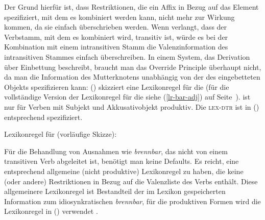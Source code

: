Der Grund hierfür ist, dass Restriktionen, die ein Affix in Bezug auf das Element spezifiziert, mit dem es
kombiniert werden kann, nicht mehr zur Wirkung kommen, da sie einfach überschrieben werden.
Wenn \zb \bars verlangt, dass der Verbstamm, mit dem es kombiniert wird, transitiv ist, würde es bei
der Kombination mit einem intransitiven Stamm die Valenzinformation des intransitiven Stammes
einfach überschreiben.
In einem System, das Derivation über Einbettung beschreibt, braucht man das Override Principle
überhaupt nicht, da man die Information des Mutterknotens unabhängig von der des eingebetteten
Objekts spezifizieren kann: () skizziert eine Lexikonregel für die \bard (für die
vollständige Version der Lexikonregel für die \bard siehe (\ref{lr-bar-adj}) auf Seite~\pageref{lr-bar-adj}).
\bard ist nur für Verben mit Subjekt und Akkusativobjekt produktiv. Die \textsc{lex-dtr} ist in
() entsprechend spezifiziert. 

\eas
\label{lr-bard-skizze}%
Lexikonregel für \bard (vorläufige Skizze):\\
\zs

Für die Behandlung von Ausnahmen wie \zb \emph{brennbar}, das nicht von einem transitiven Verb
abgeleitet ist, benötigt man keine Defaults. Es reicht, eine entsprechend allgemeine (nicht
produktive) Lexikonregel zu haben, die keine (oder andere) Restriktionen in Bezug auf die Valenzliste des Verbs enthält. 
Diese allgemeinere Lexikonregel ist Bestandteil der im Lexikon gespeicherten Information
zum idiosynkratischen \emph{brennbar}, für die produktiven Formen wird die Lexikonregel in ()
verwendet \citep[, 68]{Riehemann98a}.



